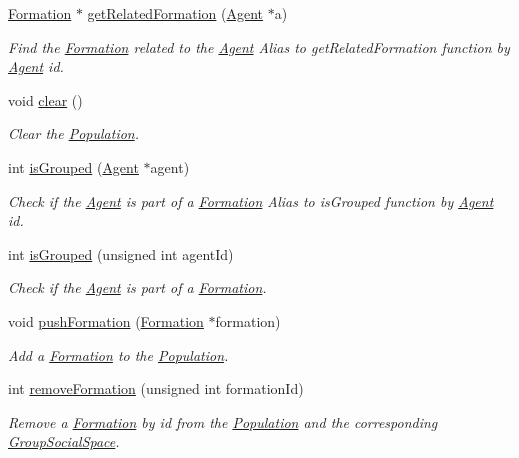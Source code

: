 \begin{DoxyCompactItemize}
\hyperlink{classFormation}{Formation} $\ast$ \hyperlink{classPopulation_a3ebbdff664c498dcdbcdf9941c710b6f}{get\+Related\+Formation} (\hyperlink{classAgent}{Agent} $\ast$a)
\begin{DoxyCompactList}\small\item\em Find the \hyperlink{classFormation}{Formation} related to the \hyperlink{classAgent}{Agent} Alias to get\+Related\+Formation function by \hyperlink{classAgent}{Agent} id. \end{DoxyCompactList}\item 
void \hyperlink{classPopulation_a5a42d2a59c007194fec4d3168807e54d}{clear} ()
\begin{DoxyCompactList}\small\item\em Clear the \hyperlink{classPopulation}{Population}. \end{DoxyCompactList}\item 
int \hyperlink{classPopulation_a8d552e2753c24f694066f80a62374b7e}{is\+Grouped} (\hyperlink{classAgent}{Agent} $\ast$agent)
\begin{DoxyCompactList}\small\item\em Check if the \hyperlink{classAgent}{Agent} is part of a \hyperlink{classFormation}{Formation} Alias to is\+Grouped function by \hyperlink{classAgent}{Agent} id. \end{DoxyCompactList}\item 
int \hyperlink{classPopulation_a708335a33351906ecf7861c1bbcffa46}{is\+Grouped} (unsigned int agent\+Id)
\begin{DoxyCompactList}\small\item\em Check if the \hyperlink{classAgent}{Agent} is part of a \hyperlink{classFormation}{Formation}. \end{DoxyCompactList}\item 
void \hyperlink{classPopulation_a2cb08ce6189854de61a8395242854050}{push\+Formation} (\hyperlink{classFormation}{Formation} $\ast$formation)
\begin{DoxyCompactList}\small\item\em Add a \hyperlink{classFormation}{Formation} to the \hyperlink{classPopulation}{Population}. \end{DoxyCompactList}\item 
int \hyperlink{classPopulation_a576b1d3fd6fdfce01d3c320dca09d736}{remove\+Formation} (unsigned int formation\+Id)
\begin{DoxyCompactList}\small\item\em Remove a \hyperlink{classFormation}{Formation} by id from the \hyperlink{classPopulation}{Population} and the corresponding \hyperlink{classGroupSocialSpace}{Group\+Social\+Space}. \end{DoxyCompactList}\item 

\end{DoxyCompactItemize}
